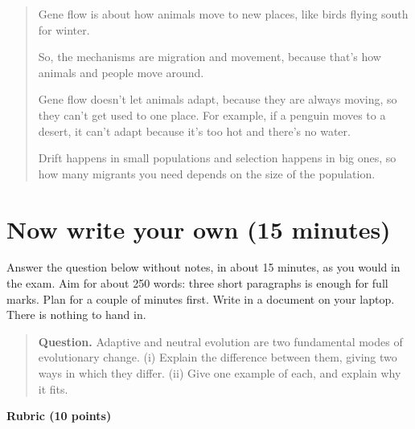 \documentclass[
  a4paper]{book}
\begin{document}
\begin{quote}
Gene flow is about how animals move to new places, like birds flying south for winter.

So, the mechanisms are migration and movement, because that's how animals and people move around.

Gene flow doesn't let animals adapt, because they are always moving, so they can't get used to one place. For example, if a penguin moves to a desert, it can't adapt because it's too hot and there's no water.

Drift happens in small populations and selection happens in big ones, so how many migrants you need depends on the size of the population.
\end{quote}

\section{Now write your own (15 minutes)}\label{now-write-your-own-15-minutes}

Answer the question below without notes, in about 15 minutes, as you would in the exam. Aim for about 250 words: three short paragraphs is enough for full marks. Plan for a couple of minutes first. Write in a document on your laptop. There is nothing to hand in.

\begin{quote}
\textbf{Question.} Adaptive and neutral evolution are two fundamental modes of evolutionary change. (i) Explain the difference between them, giving two ways in which they differ. (ii) Give one example of each, and explain why it fits.
\end{quote}

\textbf{Rubric (10 points)}
\end{document}
